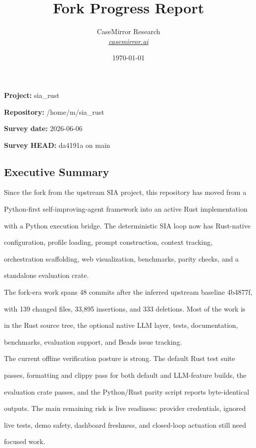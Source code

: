 \documentclass[twocolumn,10pt,letterpaper]{article}
\title{\vspace{-2.3em}\Large\bfseries\color{titlebg} Fork Progress Report\vspace{-0.6em}}
\author{\normalsize CaseMirror Research \\ \footnotesize\itshape\href{https://casemirror.ai}{\textcolor{headergray}{casemirror.ai}}}
\date{{\footnotesize\color{headergray} \today}}
\begin{document}
\maketitle
\thispagestyle{firstpage}
\vspace{-0.95em}


\textbf{Project:} sia\_rust  

\textbf{Repository:} /home/m/sia\_rust  

\textbf{Survey date:} 2026-06-06  

\textbf{Survey HEAD:} da4191a on main  


\subsection{Executive Summary}

Since the fork from the upstream SIA project, this repository has moved from a

Python-first self-improving-agent framework into an active Rust implementation

with a Python execution bridge. The deterministic SIA loop now has Rust-native

configuration, profile loading, prompt construction, context tracking,

orchestration scaffolding, web visualization, benchmarks, parity checks, and a

standalone evaluation crate.


The fork-era work spans 48 commits after the inferred upstream baseline 4b4877f,

with 139 changed files, 33,895 insertions, and 333 deletions. Most of the work is

in the Rust source tree, the optional native LLM layer, tests, documentation,

benchmarks, evaluation support, and Beads issue tracking.


The current offline verification posture is strong. The default Rust test suite

passes, formatting and clippy pass for both default and LLM-feature builds, the

evaluation crate passes, and the Python/Rust parity script reports byte-identical

outputs. The main remaining risk is live readiness: provider credentials, ignored

live tests, demo safety, dashboard freshness, and closed-loop actuation still need

focused work.
\end{document}
